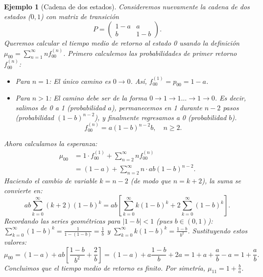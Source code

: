 \documentclass[12pt]{book}
\newtheorem{example}{Ejemplo}[chapter]
\begin{document}
\begin{example}[Cadena de dos estados]
Consideremos nuevamente la cadena de dos estados ($0, 1$) con matriz de transición
\[
P = \begin{pmatrix}
1-a & a \\
b & 1-b
\end{pmatrix}.
\]
Queremos calcular el tiempo medio de retorno al estado 0 usando la definición $\mu_{00} = \sum_{n=1}^\infty n f_{00}^{(n)}$.
Primero calculemos las probabilidades de primer retorno $f_{00}^{(n)}$:
\begin{itemize}
    \item Para $n=1$: El único camino es $0 \to 0$. Así, $f_{00}^{(1)} = p_{00} = 1-a$.
    \item Para $n > 1$: El camino debe ser de la forma $0 \to 1 \to 1 \dots \to 1 \to 0$. Es decir, salimos de 0 a 1 (probabilidad $a$), permanecemos en 1 durante $n-2$ pasos (probabilidad $(1-b)^{n-2}$), y finalmente regresamos a 0 (probabilidad $b$).
    \[ f_{00}^{(n)} = a (1-b)^{n-2} b, \quad n \ge 2. \]
\end{itemize}
Ahora calculamos la esperanza:
\begin{align*}
\mu_{00} &= 1 \cdot f_{00}^{(1)} + \sum_{n=2}^\infty n f_{00}^{(n)} \\
&= (1-a) + \sum_{n=2}^\infty n \cdot a b (1-b)^{n-2}.
\end{align*}
Haciendo el cambio de variable $k = n-2$ (de modo que $n=k+2$), la suma se convierte en:
\[
ab \sum_{k=0}^\infty (k+2) (1-b)^k = ab \left[ \sum_{k=0}^\infty k(1-b)^k + 2\sum_{k=0}^\infty (1-b)^k \right].
\]
Recordando las series geométricas para $|1-b| < 1$ (pues $b \in (0,1)$):
$\sum_{k=0}^\infty (1-b)^k = \frac{1}{1-(1-b)} = \frac{1}{b}$ y $\sum_{k=0}^\infty k(1-b)^k = \frac{1-b}{b^2}$.
Sustituyendo estos valores:
\[
\mu_{00} = (1-a) + ab \left[ \frac{1-b}{b^2} + \frac{2}{b} \right] = (1-a) + a \frac{1-b}{b} + 2a = 1 + a + \frac{a}{b} - a = 1 + \frac{a}{b}.
\]
Concluimos que el tiempo medio de retorno es finito. Por simetría, $\mu_{11} = 1 + \frac{b}{a}$.
\end{example}
\end{document}
